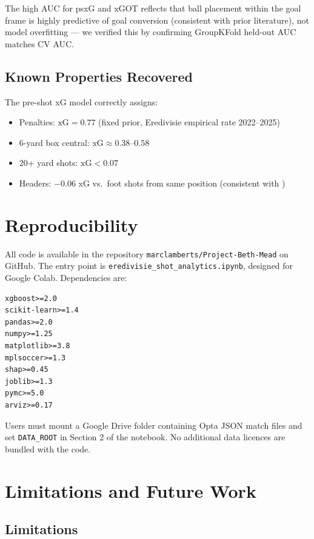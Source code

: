 \documentclass[12pt,a4paper]{article}
\begin{document}
The high AUC for psxG and xGOT reflects that ball placement within the goal frame is highly predictive of goal conversion (consistent with prior literature), not model overfitting --- we verified this by confirming GroupKFold held-out AUC matches CV AUC.

\subsection{Known Properties Recovered}

The pre-shot xG model correctly assigns:
\begin{itemize}
    \item Penalties: $\text{xG} = 0.77$ (fixed prior, Eredivisie empirical rate 2022--2025)
    \item 6-yard box central: $\text{xG} \approx 0.38$--$0.58$
    \item 20+ yard shots: $\text{xG} < 0.07$
    \item Headers: $-0.06$ xG vs.\ foot shots from same position (consistent with \citealt{rathke2017})
\end{itemize}

\section{Reproducibility}
\label{sec:repro}

All code is available in the repository \texttt{marclamberts/Project-Beth-Mead} on GitHub. The entry point is \texttt{eredivisie\_shot\_analytics.ipynb}, designed for Google Colab. Dependencies are:

\begin{lstlisting}
xgboost>=2.0
scikit-learn>=1.4
pandas>=2.0
numpy>=1.25
matplotlib>=3.8
mplsoccer>=1.3
shap>=0.45
joblib>=1.3
pymc>=5.0
arviz>=0.17
\end{lstlisting}

Users must mount a Google Drive folder containing Opta JSON match files and set \texttt{DATA\_ROOT} in Section 2 of the notebook. No additional data licences are bundled with the code.

\section{Limitations and Future Work}
\label{sec:limits}

\subsection{Limitations}
\end{document}
